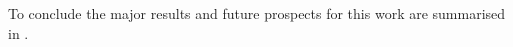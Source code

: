 \documentclass[../Thesis-IJspeert.tex]{subfiles}
\begin{document}
To conclude the major results and future prospects for this work are summarised in .
\fi

%
%
%
%
%
%
%
\end{document}
